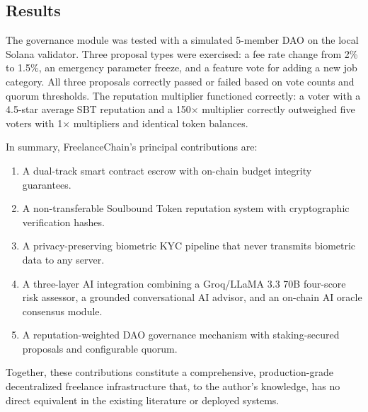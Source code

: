 \subsection{Results}

The governance module was tested with a simulated 5-member DAO on the local Solana validator. Three proposal types were exercised: a fee rate change from 2\% to 1.5\%, an emergency parameter freeze, and a feature vote for adding a new job category. All three proposals correctly passed or failed based on vote counts and quorum thresholds. The reputation multiplier functioned correctly: a voter with a 4.5-star average SBT reputation and a 150$\times$ multiplier correctly outweighed five voters with 1$\times$ multipliers and identical token balances.

In summary, FreelanceChain's principal contributions are:
\begin{enumerate}
    \item A dual-track smart contract escrow with on-chain budget integrity guarantees.
    \item A non-transferable Soulbound Token reputation system with cryptographic verification hashes.
    \item A privacy-preserving biometric KYC pipeline that never transmits biometric data to any server.
    \item A three-layer AI integration combining a Groq/LLaMA 3.3 70B four-score risk assessor, a grounded conversational AI advisor, and an on-chain AI oracle consensus module.
    \item A reputation-weighted DAO governance mechanism with staking-secured proposals and configurable quorum.
\end{enumerate}

Together, these contributions constitute a comprehensive, production-grade decentralized freelance infrastructure that, to the author's knowledge, has no direct equivalent in the existing literature or deployed systems.
